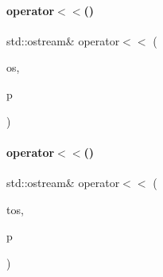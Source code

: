 \mbox{\label{_parts_8cpp_ab32c05e13dae5fcc5abde983898567ef}} 
\paragraph{\texorpdfstring{operator$<$$<$()}{operator<<()}\hspace{0.1cm}{\footnotesize\ttfamily [19/20]}}
{\footnotesize\ttfamily std\+::ostream\& operator$<$$<$ (\begin{DoxyParamCaption}\item[{std\+::ostream \&}]{os,  }\item[{const \mbox{\hyperlink{class_h_d_d}{H\+DD}} \&}]{p }\end{DoxyParamCaption})}

\mbox{\label{_parts_8cpp_a59d777ba1e3bc0c9c209fb084ce91aa3}} 
\paragraph{\texorpdfstring{operator$<$$<$()}{operator<<()}\hspace{0.1cm}{\footnotesize\ttfamily [20/20]}}
{\footnotesize\ttfamily std\+::ostream\& operator$<$$<$ (\begin{DoxyParamCaption}\item[{\mbox{\hyperlink{structutos__ostream}{utos\+\_\+ostream}}}]{tos,  }\item[{const \mbox{\hyperlink{class_h_d_d}{H\+DD}} \&}]{p }\end{DoxyParamCaption})}


